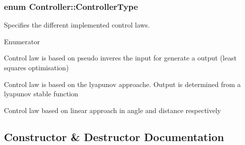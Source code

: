 \subsubsection[{\texorpdfstring{Controller\+Type}{ControllerType}}]{\setlength{\rightskip}{0pt plus 5cm}enum {\bf Controller\+::\+Controller\+Type}}\hypertarget{classController_aa6d956c4c220461a4152415ffa78690a}{}\label{classController_aa6d956c4c220461a4152415ffa78690a}


Specifies the different implemented control laws. 

\begin{Desc}
\item[Enumerator]\par
\begin{description}
\item[{\em 
pseudo\+\_\+inverse\hypertarget{classController_aa6d956c4c220461a4152415ffa78690aad2e9073ef821965020410686a3c89483}{}\label{classController_aa6d956c4c220461a4152415ffa78690aad2e9073ef821965020410686a3c89483}
}]Control law is based on pseudo inveres the input for generate a output (least squares optimisation) \item[{\em 
lypanov\hypertarget{classController_aa6d956c4c220461a4152415ffa78690aaed0e850e561d54619d85f32c37f5bfab}{}\label{classController_aa6d956c4c220461a4152415ffa78690aaed0e850e561d54619d85f32c37f5bfab}
}]Control law is based on the lyapunov approache. Output is determined from a lyapunov stable function \item[{\em 
angle\+\_\+distance\hypertarget{classController_aa6d956c4c220461a4152415ffa78690aa7ab0ee34114a951d4491d6eb73500cdc}{}\label{classController_aa6d956c4c220461a4152415ffa78690aa7ab0ee34114a951d4491d6eb73500cdc}
}]Control law based on linear approach in angle and distance respectively \end{description}
\end{Desc}


\subsection{Constructor \& Destructor Documentation}
